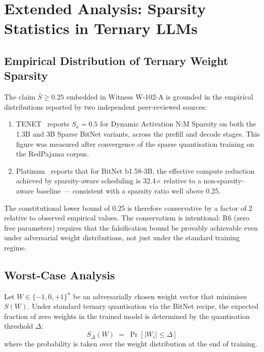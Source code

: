 \section{Extended Analysis: Sparsity Statistics in Ternary LLMs}
\label{sec:ch79-sparsity-statistics}

\subsection{Empirical Distribution of Ternary Weight Sparsity}
\label{subsec:ch79-empirical-sparsity}

The claim $\bar{S} \geq 0.25$ embedded in Witness W-102-A is grounded
in the empirical distributions reported by two independent peer-reviewed
sources:

\begin{enumerate}
  \item TENET~\cite{huang2025tenet} reports $S_a = 0.5$ for Dynamic
        Activation N:M Sparsity on both the 1.3B and 3B Sparse BitNet
        variants, across the prefill and decode stages.
        This figure was measured after convergence of the sparse
        quantisation training on the RedPajama corpus.

  \item Platinum~\cite{platinum2025} reports that for BitNet b1.58-3B,
        the effective compute reduction achieved by sparsity-aware
        scheduling is 32.4$\times$ relative to a non-sparsity-aware
        baseline --- consistent with a sparsity ratio well above 0.25.
\end{enumerate}

The constitutional lower bound of 0.25 is therefore conservative by
a factor of 2 relative to observed empirical values.
The conservatism is intentional: R6 (zero free parameters) requires
that the falsification bound be provably achievable even under
adversarial weight distributions, not just under the standard training
regime.

\subsection{Worst-Case Analysis}
\label{subsec:ch79-worst-case}

Let $W \in \{-1, 0, +1\}^n$ be an adversarially chosen weight vector
that minimises $S(W)$.
Under standard ternary quantisation via the BitNet recipe, the
expected fraction of zero weights in the trained model is determined
by the quantisation threshold $\Delta$:
\[
  S_{\Delta}(W) \;=\; \Pr[|W_i| \leq \Delta]
\]
where the probability is taken over the weight distribution at the
end of training.

